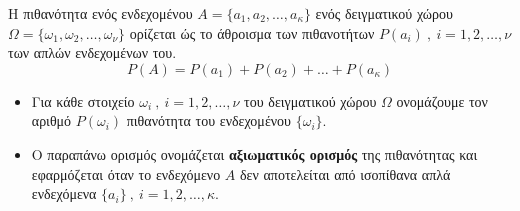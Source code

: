 Η πιθανότητα ενός ενδεχομένου $ A=\{a_1,a_2,\ldots,a_\kappa\} $ ενός δειγματικού χώρου $ \varOmega=\{\omega_1,\omega_2,\ldots,\omega_\nu\} $ ορίζεται ώς το άθροισμα των πιθανοτήτων $ P(a_i)\ ,\ i=1,2,\ldots,\nu $ των απλών ενδεχομένων του.
\[ P(A)=P(a_1)+P(a_2)+\ldots+P(a_\kappa) \]
\begin{itemize}[itemsep=0mm]
\item Για κάθε στοιχείο $ \omega_i\ ,\ i=1,2,\ldots,\nu $ του δειγματικού χώρου $ \varOmega $ ονομάζουμε τον αριθμό $ P(\omega_i) $ πιθανότητα του ενδεχομένου $ \{\omega_i\} $.
\item Ο παραπάνω ορισμός ονομάζεται \textbf{αξιωματικός ορισμός} της πιθανότητας και εφαρμόζεται όταν το ενδεχόμενο $ A $ δεν αποτελείται από ισοπίθανα απλά ενδεχόμενα $ \{a_i\}\ ,\ i=1,2,\ldots,\kappa $.
\end{itemize}
